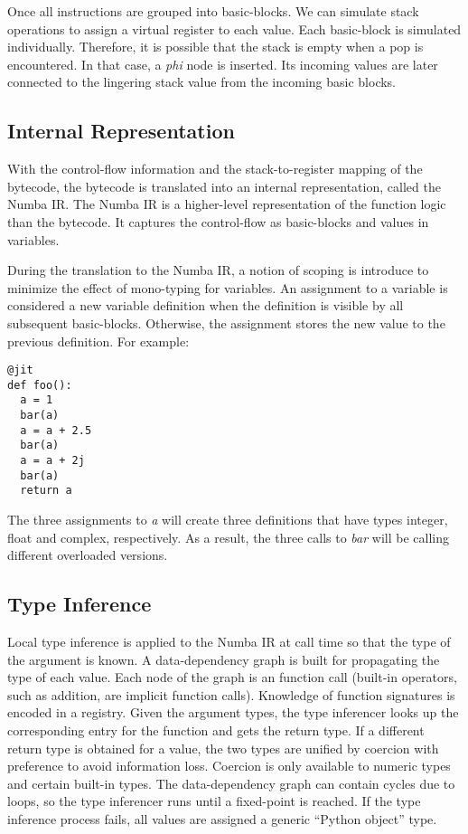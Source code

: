 \documentclass{acm_proc_article-sp}
\begin{document}
Once all instructions are grouped into basic-blocks. We can simulate stack
operations to assign a virtual register to each value.  Each basic-block is
simulated individually. Therefore, it is possible that the stack is empty when
a pop is encountered. In that case, a \textit{phi} node is inserted.
Its incoming values are later connected to the lingering stack value from the
incoming basic blocks.

\subsection{Internal Representation}

With the control-flow information and the stack-to-register mapping
of the bytecode, the bytecode is translated into an internal representation,
called the Numba IR. The Numba IR is a higher-level representation of the
function logic than the bytecode. It captures the control-flow as basic-blocks
and values in variables.

During the translation to the Numba IR, a notion of scoping is introduce to
minimize the effect of mono-typing for variables. An assignment to a variable
is considered a new variable definition when the definition is visible by all
subsequent basic-blocks. Otherwise, the assignment stores the new value to
the previous definition.  For example:

\begin{lstlisting}
@jit
def foo():
  a = 1
  bar(a)
  a = a + 2.5
  bar(a)
  a = a + 2j
  bar(a)
  return a
\end{lstlisting}

The three assignments to \textit{a} will create three definitions that have
types integer, float and complex, respectively.  As a result, the three
calls to \textit{bar} will be calling different overloaded versions.

\subsection{Type Inference}

Local type inference is applied to the Numba IR at call time so that
the type of the argument is known. A data-dependency graph is built
for propagating the type of each value.  Each node of the graph is an
function call (built-in operators, such as addition, are implicit
function calls). Knowledge of function signatures is encoded in a
registry.  Given the argument types, the type inferencer looks up the
corresponding entry for the function and gets the return type. If a
different return type is obtained for a value, the two types are
unified by coercion with preference to avoid information
loss. Coercion is only available to numeric types and certain built-in
types. The data-dependency graph can contain cycles due to loops, so
the type inferencer runs until a fixed-point is reached. If the type
inference process fails, all values are assigned a generic ``Python
object'' type.
\end{document}
